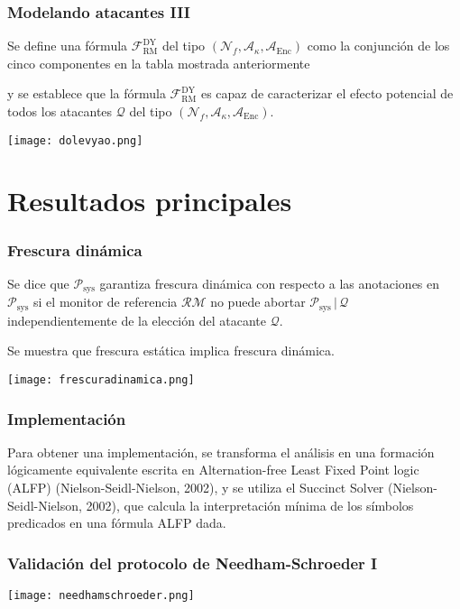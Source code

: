 \documentclass{beamer}
\begin{document}
\begin{frame}
    \frametitle{Modelando atacantes III}
    \pause
    Se define una fórmula \(\mathcal{F}^{\text{DY}}_{\text{RM}}\) del tipo \((\mathcal{N}_f, \mathcal{A}_\kappa, \mathcal{A}_{\text{Enc}})\) como la conjunción de los cinco componentes en la tabla mostrada anteriormente
    \pause[3]
    
    y se establece que la fórmula \(\mathcal{F}^{\text{DY}}_{\text{RM}}\) es capaz de caracterizar el efecto potencial de todos los atacantes \(\mathcal{Q}\) del tipo \((\mathcal{N}_f, \mathcal{A}_\kappa, \mathcal{A}_{\text{Enc}})\).
    \pause[4]
    \begin{center}
        \texttt{[image: dolevyao.png]}
    \end{center}
\end{frame}

\section{Resultados principales}

\begin{frame}
    \frametitle{Frescura dinámica}
    \pause
    Se dice que \(\mathcal{P}_{\text{sys}}\) garantiza frescura dinámica con respecto a las anotaciones en \(\mathcal{P}_{\text{sys}}\) si el monitor de referencia \(\mathcal{RM}\) no puede abortar \(\mathcal{P}_{\text{sys}} \,|\, \mathcal{Q}\) independientemente de la elección del atacante \(\mathcal{Q}\).
    \pause[3]

    Se muestra que frescura estática implica frescura dinámica.
    \pause[4]
    \begin{center}
        \texttt{[image: frescuradinamica.png]}
    \end{center}
\end{frame}

\begin{frame}
    \frametitle{Implementación}
    \pause
    Para obtener una implementación, se transforma el análisis en una formación lógicamente equivalente escrita en Alternation-free Least Fixed Point logic (ALFP) (Nielson-Seidl-Nielson, 2002), y se utiliza el Succinct Solver (Nielson-Seidl-Nielson, 2002), que calcula la interpretación mínima de los símbolos predicados en una fórmula ALFP dada.
\end{frame}

\begin{frame}
    \frametitle{Validación del protocolo de Needham-Schroeder I}
    \pause
    \begin{center}
        \texttt{[image: needhamschroeder.png]}
    \end{center}
\end{frame}
\end{document}
